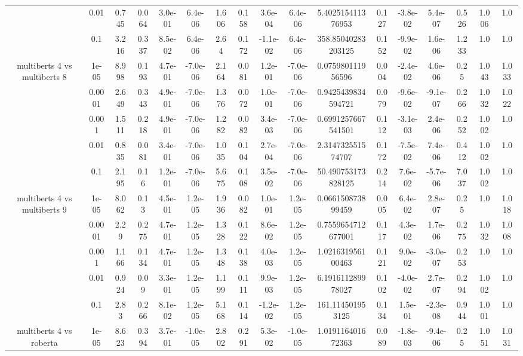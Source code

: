 \begin{tabular}{|c|c|c|c|c|c|c|c|c|c|c|c|c|c|c|c|c|}
 & 0.01 & 0.745 & 0.064 & 3.0e-01 & 6.4e-06 & 1.606 & 0.158 & 3.6e-04 & 6.4e-06 & 5.402515411376953 & 0.127 & -3.8e-02 & 5.4e-07 & 0.526 & 1.006 & 1.0 \\
 & 0.1 & 3.216 & 0.337 & 8.5e-02 & 6.4e-06 & 2.64 & 0.172 & -1.1e-02 & 6.4e-06 & 358.85040283203125 & 0.152 & -9.9e-02 & 1.6e-06 & 1.233 & 1.0 & 1.0 \\
\hline
\multirow{5}{*}{multiberts 4 vs multiberts 8} & 1e-05 & 8.998 & 0.193 & 4.7e-01 & -7.0e-06 & 2.164 & 0.081 & 1.2e-01 & -7.0e-06 & 0.075980111956596 & 0.004 & -2.4e-02 & 4.6e-06 & 0.25 & 1.043 & 1.033 \\
 & 0.0001 & 2.649 & 0.343 & 4.9e-01 & -7.0e-06 & 1.376 & 0.072 & 1.0e-01 & -7.0e-06 & 0.9425439834594721 & 0.079 & -9.6e-02 & -9.1e-07 & 0.266 & 1.032 & 1.022 \\
 & 0.001 & 1.511 & 0.218 & 4.9e-01 & -7.0e-06 & 1.282 & 0.082 & 3.4e-03 & -7.0e-06 & 0.6991257667541501 & 0.112 & -3.1e-03 & 2.4e-06 & 0.252 & 1.002 & 1.0 \\
 & 0.01 & 0.835 & 0.081 & 3.4e-01 & -7.0e-06 & 1.035 & 0.104 & 2.7e-04 & -7.0e-06 & 2.314732551574707 & 0.172 & -7.5e-02 & 7.4e-06 & 0.412 & 1.002 & 1.0 \\
 & 0.1 & 2.195 & 0.16 & 1.2e-01 & -7.0e-06 & 5.675 & 0.108 & 3.5e-02 & -7.0e-06 & 50.490753173828125 & 0.214 & 7.6e-02 & -5.7e-06 & 7.037 & 1.002 & 1.0 \\
\hline
\multirow{5}{*}{multiberts 4 vs multiberts 9} & 1e-05 & 8.062 & 0.13 & 4.5e-01 & 1.2e-05 & 1.936 & 0.082 & 1.0e-01 & 1.2e-05 & 0.066150873899459 & 0.005 & 6.4e-02 & 2.8e-07 & 0.25 & 1.0 & 1.018 \\
 & 0.0001 & 2.29 & 0.275 & 4.7e-01 & 1.2e-05 & 1.328 & 0.122 & 8.6e-02 & 1.2e-05 & 0.7559654712677001 & 0.117 & 4.3e-02 & 1.7e-06 & 0.275 & 1.032 & 1.008 \\
 & 0.001 & 1.166 & 0.134 & 4.7e-01 & 1.2e-05 & 1.348 & 0.138 & 4.0e-03 & 1.2e-05 & 1.021631956100463 & 0.121 & 9.0e-02 & -3.0e-07 & 0.253 & 1.0 & 1.0 \\
 & 0.01 & 0.924 & 0.09 & 3.3e-01 & 1.2e-05 & 1.199 & 0.111 & 9.9e-03 & 1.2e-05 & 6.191611289978027 & 0.102 & -4.0e-02 & 2.7e-07 & 0.294 & 1.002 & 1.0 \\
 & 0.1 & 2.83 & 0.266 & 8.1e-02 & 1.2e-05 & 5.168 & 0.114 & -1.2e-02 & 1.2e-05 & 161.114501953125 & 0.134 & 1.5e-01 & -2.3e-08 & 0.944 & 1.001 & 1.0 \\
\hline
\multirow{5}{*}{multiberts 4 vs roberta } & 1e-05 & 8.623 & 0.394 & 3.7e-01 & -1.0e-05 & 2.802 & 0.291 & 5.3e-02 & -1.0e-05 & 1.019116401672363 & 0.089 & -1.8e-03 & -9.4e-06 & 0.25 & 1.051 & 1.031 \\

\end{tabular}
